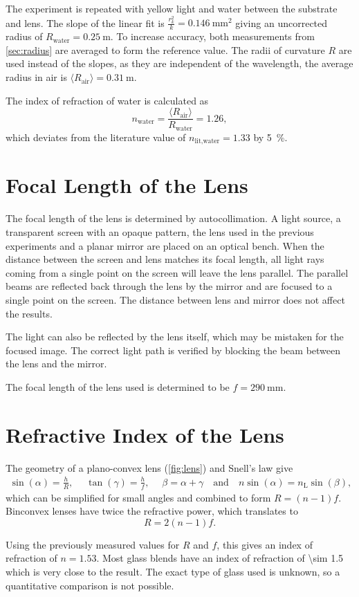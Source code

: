 The experiment is repeated with yellow light and water between the substrate and lens.
The slope of the linear fit is $\frac{r_k^2}{k} = \SI{0.146}{\mm\squared}$ giving an uncorrected radius of $R_\text{water} = \SI{0.25}{\meter}$.
To increase accuracy, both measurements from \autoref{sec:radius} are averaged to form the reference value.
The radii of curvature $R$ are used instead of the slopes, as they are independent of the wavelength, the average radius in air is $\langle R_\text{air} \rangle = \SI{0.31}{\meter}$.

The index of refraction of water is calculated as
\begin{equation*}
	n_\text{water} = \frac{\langle R_\text{air} \rangle}{R_\text{water}} = \num{1.26},
\end{equation*}
which deviates from the literature value of $n_\text{lit,water} = \num{1.33}$ by \SI{5}{\percent}.

\section{Focal Length of the Lens}

The focal length of the lens is determined by autocollimation.
A light source, a transparent screen with an opaque pattern, the lens used in the previous experiments and a planar mirror are placed on an optical bench.
When the distance between the screen and lens matches its focal length, all light rays coming from a single point on the screen will leave the lens parallel.
The parallel beams are reflected back through the lens by the mirror and are focused to a single point on the screen.
The distance between lens and mirror does not affect the results.

The light can also be reflected by the lens itself, which may be mistaken for the focused image.
The correct light path is verified by blocking the beam between the lens and the mirror.

The focal length of the lens used is determined to be $f = \SI{290}{\mm}$.

\section{Refractive Index of the Lens}
The geometry of a plano-convex lens (\autoref{fig:lens}) and Snell's law give
\begin{gather*}
	\sin(\alpha) = \frac{h}{R}, \quad\;
	\tan(\gamma) = \frac{h}{f}, \quad\;
	\beta = \alpha + \gamma \quad \text{and} \quad
	n \sin(\alpha) = n_\text{L} \sin(\beta),
\end{gather*}
which can be simplified for small angles and combined to form $R = \left(n - 1\right)f$.
Binconvex lenses have twice the refractive power, which translates to
\begin{equation*}
	R = 2 \left(n - 1\right)f.
\end{equation*}

Using the previously measured values for $R$ and $f$, this gives an index of refraction of $n = \num{1.53}$.
Most glass blends have an index of refraction of \num{\sim 1.5} which is very close to the result.
The exact type of glass used is unknown, so a quantitative comparison is not possible.
